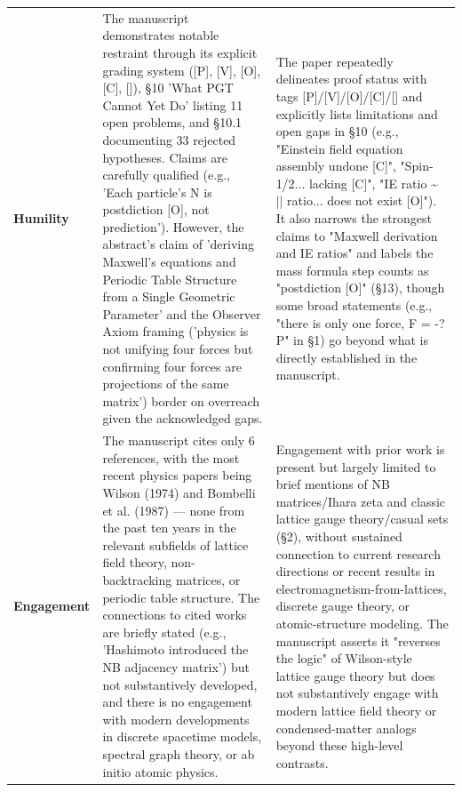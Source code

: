 \documentclass[11pt]{article}
\begin{document}
\begin{longtable}{@{} p{2.2cm} p{6.3cm} p{6.3cm} @{}}
\rowcolor{rowgray}
\textbf{Humility} &
The manuscript demonstrates notable restraint through its explicit grading system ([P], [V], [O], [C], [\texttimes{}]), \S{}10 'What PGT Cannot Yet Do' listing 11 open problems, and \S{}10.1 documenting 33 rejected hypotheses. Claims are carefully qualified (e.g., 'Each particle's N is postdiction [O], not prediction'). However, the abstract's claim of 'deriving Maxwell's equations and Periodic Table Structure from a Single Geometric Parameter' and the Observer Axiom framing ('physics is not unifying four forces but confirming four forces are projections of the same matrix') border on overreach given the acknowledged gaps. &
The paper repeatedly delineates proof status with tags [P]/[V]/[O]/[C]/[\texttimes{}] and explicitly lists limitations and open gaps in \S{}10 (e.g., "Einstein field equation assembly undone [C]", "Spin-1/2... lacking [C]", "IE ratio \textasciitilde{} |\textlambda{}| ratio... does not exist [O]"). It also narrows the strongest claims to "Maxwell derivation and IE ratios" and labels the mass formula step counts as "postdiction [O]" (\S{}13), though some broad statements (e.g., "there is only one force, F = -?P" in \S{}1) go beyond what is directly established in the manuscript. \\[6pt]

\textbf{Engagement} &
The manuscript cites only 6 references, with the most recent physics papers being Wilson (1974) and Bombelli et al. (1987) --- none from the past ten years in the relevant subfields of lattice field theory, non-backtracking matrices, or periodic table structure. The connections to cited works are briefly stated (e.g., 'Hashimoto introduced the NB adjacency matrix') but not substantively developed, and there is no engagement with modern developments in discrete spacetime models, spectral graph theory, or ab initio atomic physics. &
Engagement with prior work is present but largely limited to brief mentions of NB matrices/Ihara zeta and classic lattice gauge theory/casual sets (\S{}2), without sustained connection to current research directions or recent results in electromagnetism-from-lattices, discrete gauge theory, or atomic-structure modeling. The manuscript asserts it "reverses the logic" of Wilson-style lattice gauge theory but does not substantively engage with modern lattice field theory or condensed-matter analogs beyond these high-level contrasts. \\[6pt]


\end{longtable}
\end{document}
